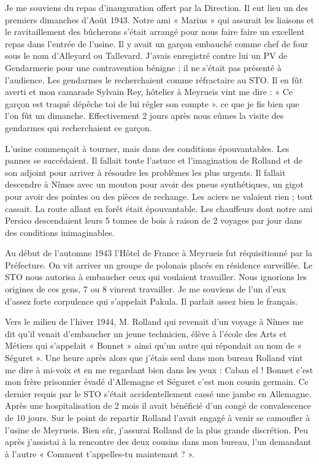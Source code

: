 \vspace{0.45cm}

Je me souviens du repas d’inauguration offert par la Direction. Il eut lieu un des premiers
dimanches d’Août 1943. Notre ami « Marius » qui assurait les liaisons et le ravitaillement des
bûcherons s’était arrangé pour nous faire faire un excellent repas dans l’entrée de l’usine. Il y
avait un garçon embauché comme chef de four sous le nom d’Alleyard ou Tallevard. J’avais
enregistré contre lui un PV de Gendarmerie pour une contravention bénigne ; il ne s’était pas
présenté à l’audience. Les gendarmes le recherchaient comme réfractaire au STO. Il en fût
averti et mon camarade Sylvain Rey, hôtelier à Meyrueis vint me dire : « Ce garçon est traqué dépêche toi de lui régler son compte ». ce que je fis bien que l’on fût un dimanche.
Effectivement 2 jours après nous eûmes la visite des gendarmes qui recherchaient ce garçon.

\vspace{0.45cm}

L’usine commençait à tourner, mais dans des conditions épouvantables. Les pannes se
succédaient. Il fallait toute l’astuce et l’imagination de Rolland et de son adjoint pour arriver à
résoudre les problèmes les plus urgents. Il fallait descendre à Nîmes avec un mouton pour
avoir des pneus synthétiques, un gigot pour avoir des pointes ou des pièces de rechange. Les
aciers ne valaient rien ; tout cassait. La route allant en forêt était épouvantable. Les chauffeurs
dont notre ami Persico descendaient leurs 5 tonnes de bois à raison de 2 voyages par jour dans
des conditions inimaginables.

\vspace{0.45cm}

Au début de l’automne 1943 l’Hôtel de France à Meyrueis fut réquisitionné par la Préfecture.
On vit arriver un groupe de polonais placés en résidence surveillée. Le STO nous autorisa à
embaucher ceux qui voulaient travailler. Nous ignorions les origines de ces gens, 7 ou 8
vinrent travailler. Je me souviens de l’un d’eux d’assez forte corpulence qui s’appelait Pakula.
Il parlait assez bien le français.

\vspace{0.45cm}

Vers le milieu de l’hiver 1944, M. Rolland qui revenait d’un voyage à Nîmes me dit qu’il
venait d’embaucher un jeune technicien, élève à l’école des Arts et Métiers qui s’appelait
« Bonnet » ainsi qu’un autre qui répondait au nom de « Séguret ». Une heure après alors que
j’étais seul dans mon bureau Rolland vint me dire à mi-voix et en me regardant bien dans les
yeux : Caban el ! Bonnet c’est mon frère prisonnier évadé d’Allemagne et Séguret c’est mon
cousin germain. Ce dernier requis par le STO s’était accidentellement cassé une jambe en
Allemagne. Après une hospitalisation de 2 mois il avait bénéficié d’un congé de
convalescence de 10 jours. Sur le point de repartir Rolland l’avait engagé à venir se camoufler
à l’usine de Meyrueis. Bien sûr, j’assurai Rolland de la plus grande discrétion. Peu après
j’assistai à la rencontre des deux cousins dans mon bureau, l’un demandant à l’autre
« Comment t’appelles-tu maintenant ? ».

